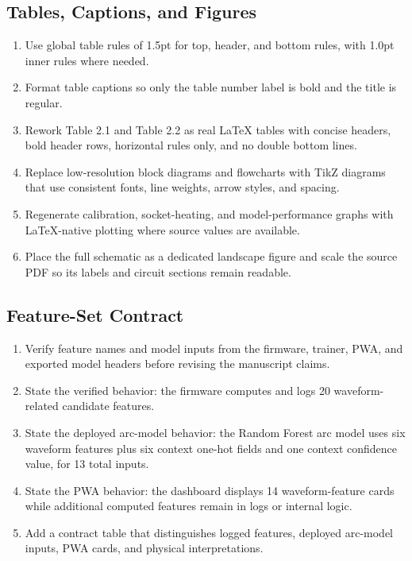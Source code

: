 \subsection*{Tables, Captions, and Figures}
\begin{enumerate}
  \item Use global table rules of 1.5pt for top, header, and bottom rules, with
  1.0pt inner rules where needed.
  \item Format table captions so only the table number label is bold and the
  title is regular.
  \item Rework Table 2.1 and Table 2.2 as real LaTeX tables with concise
  headers, bold header rows, horizontal rules only, and no double bottom
  lines.
  \item Replace low-resolution block diagrams and flowcharts with TikZ diagrams
  that use consistent fonts, line weights, arrow styles, and spacing.
  \item Regenerate calibration, socket-heating, and model-performance graphs
  with LaTeX-native plotting where source values are available.
  \item Place the full schematic as a dedicated landscape figure and scale the
  source PDF so its labels and circuit sections remain readable.
\end{enumerate}

\subsection*{Feature-Set Contract}
\begin{enumerate}
  \item Verify feature names and model inputs from the firmware, trainer, PWA,
  and exported model headers before revising the manuscript claims.
  \item State the verified behavior: the firmware computes and logs 20
  waveform-related candidate features.
  \item State the deployed arc-model behavior: the Random Forest arc model uses
  six waveform features plus six context one-hot fields and one context
  confidence value, for 13 total inputs.
  \item State the PWA behavior: the dashboard displays 14 waveform-feature
  cards while additional computed features remain in logs or internal logic.
  \item Add a contract table that distinguishes logged features, deployed
  arc-model inputs, PWA cards, and physical interpretations.
\end{enumerate}

